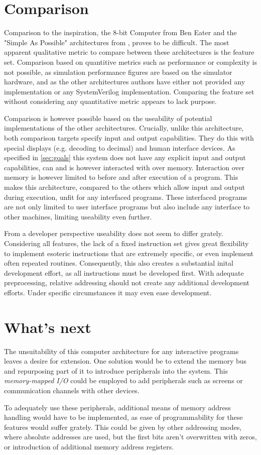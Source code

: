 \section{Comparison}
Comparison to the inspiration, the 8-bit Computer from Ben Eater \cite{beneater} and the "Simple As Possible" architectures from \cite{malvino1983a}, proves to be difficult. The most apparent qualitative metric to compare between these architectures is the feature set. Comparison based on quantitive metrics such as performance or complexity is not possible, as simulation performance figures are based on the simulator hardware, and as the other architectures authors have either not provided any implementation or any SystemVerilog implementation. Comparing the feature set without considering any quantitative metric appears to lack purpose.

Comparison is however possible based on the useability of potential implementations of the other architectures. Crucially, unlike this architecture, both comparison targets specify input and output capabilities. They do this with special displays (e.g. decoding to decimal) and human interface devices. As specified in \ref{sec:goals} this system does not have any explicit input and output capabilities, can and is however interacted with over memory. Interaction over memory is however limited to before and after execution of a program. This makes this architecture, compared to the others which allow input and output during execution, unfit for any interfaced programs. These interfaced programs are not only limited to user interface programs but also include any interface to other machines, limiting useability even further.

From a developer perspective useability does not seem to differ grately. Considering all features, the lack of a fixed instruction set gives great flexibility to implement esoteric instructions that are extremely specific, or even implement often repeated routines. Consequently, this also creates a substantial inital development effort, as all instructions must be developed first. With adequate preprocessing, relative addressing should not create any additional development efforts. Under specific circumstances it may even ease development.

\section{What's next}
The unsuitability of this computer architecture for any interactive programs leaves a desire for extension. One solution would be to extend the memory bus and repurposing part of it to introduce peripherals into the system. This \textit{memory-mapped I/O} could be employed to add peripherals such as screens or communication channels with other devices. 

To adequately use these peripherals, additional means of memory address handling would have to be implemented, as ease of programmability for these features would suffer grately. This could be given by other addressing modes, where absolute addresses are used, but the first bits aren't overwritten with zeros, or introduction of additional memory address registers.